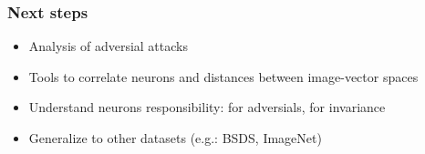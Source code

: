 \documentclass[10pt]{beamer}
\newcommand{\eg}{e.g.}
\begin{document}
\begin{frame}
    \frametitle{Next steps}
    \begin{itemize}
        \item Analysis of adversial attacks
        \item Tools to correlate neurons and distances between image-vector spaces
        \item Understand neurons responsibility: for adversials, for invariance
        \item Generalize to other datasets (\eg: BSDS, ImageNet)
    \end{itemize}
\end{frame}
\end{document}
